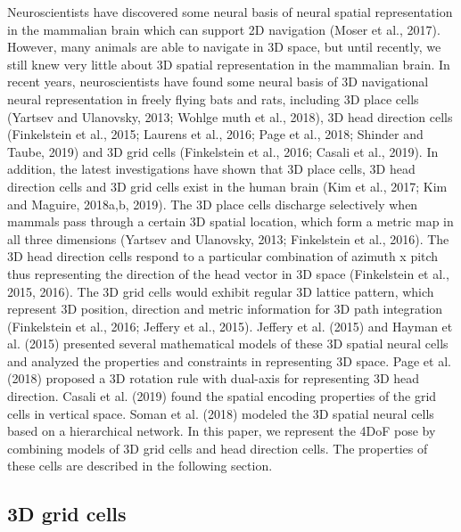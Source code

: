 Neuroscientists have discovered some neural basis of neural spatial representation in the mammalian brain which can support 2D navigation (Moser et al., 2017). 
However, many animals are able to navigate in 3D space, but until recently, we still knew very little about 3D spatial representation in the mammalian brain. 
In recent years, neuroscientists have found some neural basis of 3D navigational neural representation in freely flying bats and rats, including 3D place cells (Yartsev and Ulanovsky, 2013; Wohlge muth et al., 2018), 3D head direction cells (Finkelstein et al., 2015; Laurens et al., 2016; Page et al., 2018; Shinder and Taube, 2019) and 3D grid cells (Finkelstein et al., 2016; Casali et al., 2019). 
In addition, the latest investigations have shown that 3D place cells, 3D head direction cells and 3D grid cells exist in the human brain (Kim et al., 2017; Kim and Maguire, 2018a,b, 2019). 
The 3D place cells discharge selectively when mammals pass through a certain 3D spatial location, which form a metric map in all three dimensions (Yartsev and Ulanovsky, 2013; Finkelstein et al., 2016). 
The 3D head direction cells respond to a particular combination of azimuth x pitch thus representing the direction of the head vector in 3D space (Finkelstein et al., 2015, 2016). 
The 3D grid cells would exhibit regular 3D lattice pattern, which represent 3D position, direction and metric information for 3D path integration (Finkelstein et al., 2016; Jeffery et al., 2015). 
Jeffery et al. (2015) and Hayman et al. (2015) presented several mathematical models of these 3D spatial neural cells and analyzed the properties and constraints in representing 3D space. 
Page et al. (2018) proposed a 3D rotation rule with dual-axis for representing 3D head direction. Casali et al. (2019) found the spatial encoding properties of the grid cells in vertical space. 
Soman et al. (2018) modeled the 3D spatial neural cells based on a hierarchical network. In this paper, we represent the 4DoF pose by combining models of 3D grid cells and head direction cells. 
The properties of these cells are described in the following section.


\subsection{3D grid cells}

